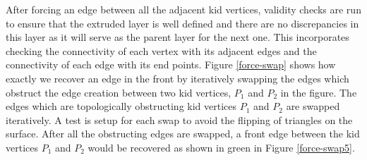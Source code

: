 After forcing an edge between all the adjacent kid vertices, validity checks are run to ensure that the extruded layer is well defined and there are no discrepancies in this layer as it will serve as the parent layer for the next one. This incorporates checking the connectivity of each vertex with its adjacent edges and the connectivity of each edge with its end points. Figure \ref{force-swap} shows how exactly we recover an edge in the front by iteratively swapping the edges which obstruct the edge creation between two kid vertices, $P_1$ and $P_2$ in the figure. The edges which are topologically obstructing kid vertices $P_1$ and $P_2$ are swapped iteratively. A test is setup for each swap to avoid the flipping of triangles on the surface. After all the obstructing edges are swapped, a front edge between the kid vertices $P_1$ and $P_2$ would be recovered as shown in green in Figure \ref{force-swap5}.